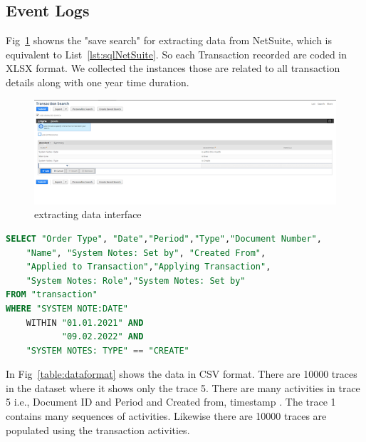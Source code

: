 \subsection{Event Logs}

Fig~\ref{figure:saveSearch} showns the "save search" for extracting data from NetSuite, which is equivalent to List~\ref{lst:sqlNetSuite}. 
So each Transaction recorded are coded in XLSX format. We collected the instances those are related to all transaction details along with one year time duration. 


\begin{figure}[!htb]
    \centering 
    \includegraphics[scale=0.7]{resource/data.png}
    \caption{extracting data interface}
    \label{figure:saveSearch}
\end{figure}



\begin{lstlisting}[language=SQL, caption={equal to SQL}, label={lst:sqlNetSuite} ]
SELECT "Order Type", "Date","Period","Type","Document Number",
    "Name", "System Notes: Set by", "Created From", 
    "Applied to Transaction","Applying Transaction", 
    "System Notes: Role","System Notes: Set by"  
FROM "transaction"
WHERE "SYSTEM NOTE:DATE" 
    WITHIN "01.01.2021" AND 
           "09.02.2022" AND 
    "SYSTEM NOTES: TYPE" == "CREATE"
\end{lstlisting}

In Fig~\ref{table:dataformat} shows the data in CSV format. There are 10000 traces in the dataset where it shows only the trace 5. There are many activities in trace 5 i.e., Document ID and Period and Created from, timestamp . The trace 1 contains many sequences of activities. Likewise there are 10000 traces are populated using the transaction activities.

